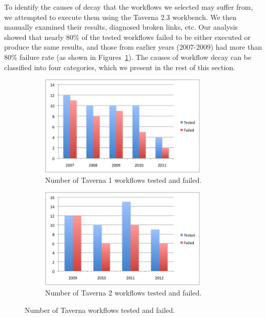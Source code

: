 To identify the causes of decay that the workflows we selected may suffer from, we attempted to execute them using the Taverna 2.3 workbench. We then manually examined their results, diagnosed broken links, etc. Our analysis showed that nearly $80\%$ of the tested workflows failed to be either executed or produce the same results, and those from earlier years (2007-2009) had more than 80\% failure rate (as shown in Figures~\ref{fig:taverna-wf-failed}). The causes of workflow decay can be classified into four categories, which we present in the rest of this section. 


\begin{figure}[h]
  \centering
  \begin{subfigure}[t]{8.25cm}
    \centering
    \includegraphics[width=8cm]{./Figures/taverna1-workflows-rate.png}
    \caption{Number of Taverna 1 workflows tested and failed.}
  \end{subfigure}
  \begin{subfigure}[t]{8.25cm}
    \centering
    \includegraphics[width=8cm]{./Figures/taverna2-workflows-rate.png}
    \caption{Number of Taverna 2 workflows tested and failed.}
  \end{subfigure}
  \caption{Number of Taverna workflows tested and failed.}
  \label{fig:taverna-wf-failed}
\end{figure}

